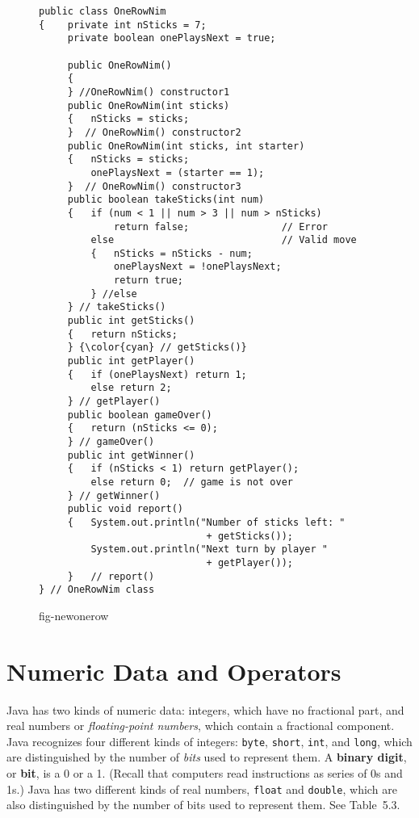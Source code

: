 \begin{figure}[h!]
\jjjprogstart
\begin{jjjlisting}
\begin{lstlisting}
public class OneRowNim
{    private int nSticks = 7;
     private boolean onePlaysNext = true;

     public OneRowNim()
     {
     } //OneRowNim() constructor1
     public OneRowNim(int sticks)
     {   nSticks = sticks;
     }  // OneRowNim() constructor2
     public OneRowNim(int sticks, int starter)
     {   nSticks = sticks;
         onePlaysNext = (starter == 1);
     }  // OneRowNim() constructor3
     public boolean takeSticks(int num)
     {   if (num < 1 || num > 3 || num > nSticks) 
             return false;                // Error
         else                             // Valid move
         {   nSticks = nSticks - num;
             onePlaysNext = !onePlaysNext;
             return true;
         } //else
     } // takeSticks()
     public int getSticks()
     {   return nSticks;
     } {\color{cyan} // getSticks()}
     public int getPlayer()
     {   if (onePlaysNext) return 1;
         else return 2;
     } // getPlayer()
     public boolean gameOver()
     {   return (nSticks <= 0);
     } // gameOver()
     public int getWinner()
     {   if (nSticks < 1) return getPlayer();
         else return 0;  // game is not over
     } // getWinner()
     public void report()
     {   System.out.println("Number of sticks left: " 
                             + getSticks());
         System.out.println("Next turn by player " 
                             + getPlayer());
     }   // report()
} // OneRowNim class
\end{lstlisting}
\end{jjjlisting}
{fig-newonerow}
\end{figure}


\section{Numeric Data and Operators}
\label{numeric-dataand-operators}
\noindent Java has two kinds of numeric data: integers, which have no fractional
part, and real numbers or {\em floating-point numbers}, which contain
a fractional component.  Java recognizes four different kinds of
integers: {\tt byte}, {\tt short}, {\tt int}, and {\tt long}, which
are distinguished by the number of {\it bits} used to represent
them. A {\bf binary digit}, or {\bf bit}, is a 0 or a 1. (Recall that
computers read instructions as series of 0s and 1s.) Java has two
different kinds of real numbers, {\tt float} and {\tt double}, which
are also distinguished by the number of bits used to represent them.
See Table~5.3.

